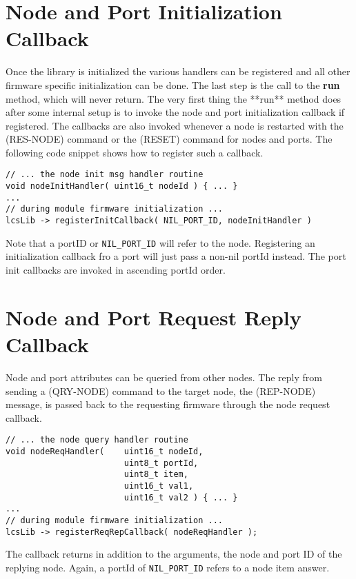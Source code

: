 \section{Node and Port Initialization Callback}

Once the library is initialized the various handlers can be registered and all other firmware specific initialization can be done. The last step is the call to the \textbf{run} method, which will never return. The very first thing the **run** method does after some internal setup is to invoke the node and port initialization callback if registered. The callbacks are also invoked whenever a node is restarted with the (RES-NODE) command or the (RESET) command for nodes and ports. The following code snippet shows how to register such a callback.

\lstset{style=codesnippetstyle}
\begin{lstlisting}
// ... the node init msg handler routine
void nodeInitHandler( uint16_t nodeId ) { ... }
...
// during module firmware initialization ...
lcsLib -> registerInitCallback( NIL_PORT_ID, nodeInitHandler )
\end{lstlisting}

Note that a portID or \texttt{NIL\_PORT\_ID} will refer to the node. Registering an initialization callback fro a port will just pass a non-nil portId instead. The port init callbacks are invoked in ascending portId order.

\section{Node and Port Request Reply Callback}

Node and port attributes can be queried from other nodes. The reply from sending a (QRY-NODE) command to the target node, the (REP-NODE) message, is passed back to the requesting firmware through the node request callback.

\lstset{style=codesnippetstyle}
\begin{lstlisting}
// ... the node query handler routine
void nodeReqHandler(    uint16_t nodeId, 
                        uint8_t portId, 
                        uint8_t item, 
                        uint16_t val1, 
                        uint16_t val2 ) { ... }
...
// during module firmware initialization ...
lcsLib -> registerReqRepCallback( nodeReqHandler );
\end{lstlisting}

The callback returns in addition to the arguments, the node and port ID of the replying node. Again, a portId of \texttt{NIL\_PORT\_ID} refers to a node item answer.

